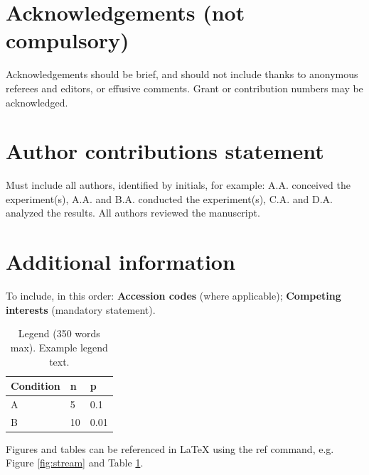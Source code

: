 \documentclass[fleqn,10pt]{wlscirep}
\begin{document}
\section*{Acknowledgements (not compulsory)}

Acknowledgements should be brief, and should not include thanks to anonymous referees and editors, or effusive comments. Grant or contribution numbers may be acknowledged.

\section*{Author contributions statement}

Must include all authors, identified by initials, for example:
A.A. conceived the experiment(s),  A.A. and B.A. conducted the experiment(s), C.A. and D.A. analyzed the results.  All authors reviewed the manuscript. 

\section*{Additional information}

To include, in this order: \textbf{Accession codes} (where applicable); \textbf{Competing interests} (mandatory statement). 





\begin{table}[ht]
\centering
\begin{tabular}{|l|l|l|}
\hline
Condition & n & p \\
\hline
A & 5 & 0.1 \\
\hline
B & 10 & 0.01 \\
\hline
\end{tabular}
\caption{\label{tab:example}Legend (350 words max). Example legend text.}
\end{table}

Figures and tables can be referenced in LaTeX using the ref command, e.g. Figure \ref{fig:stream} and Table \ref{tab:example}.
\end{document}
